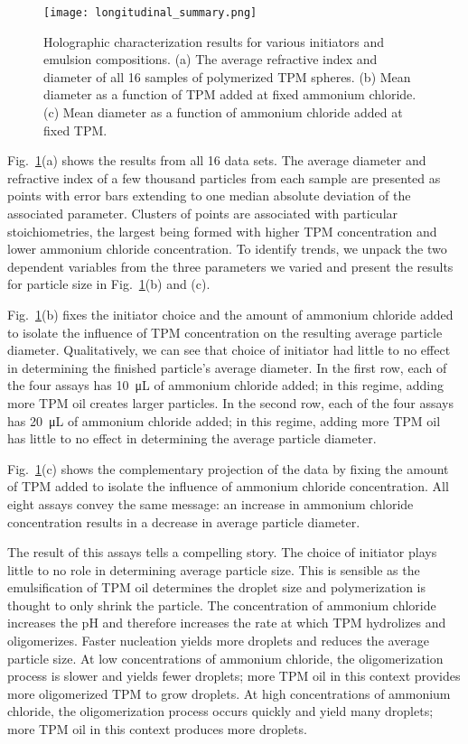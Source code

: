 \begin{figure}
    \centering
    \texttt{[image: longitudinal\_summary.png]}
    \caption{Holographic characterization results for various initiators and
      emulsion compositions. (a) The average refractive index and diameter of
      all \num{16} samples of polymerized TPM spheres.
     (b) Mean diameter as a function of TPM added at fixed ammonium chloride.
     (c) Mean diameter as a function of ammonium chloride added at fixed TPM.}
    \label{fig:longitudinal_summary}
\end{figure}

Fig.~\ref{fig:longitudinal_summary}(a) shows the results from all \num{16} data sets.
The average diameter and refractive index of a few thousand particles from each sample
are presented as points with error bars extending to one median absolute deviation
of the associated parameter. Clusters of points are associated with particular
stoichiometries, the largest being formed with higher TPM concentration
and lower ammonium chloride concentration.
To identify trends, we unpack the two dependent variables from the three
parameters we varied and present the  results for particle size in
Fig.~\ref{fig:longitudinal_summary}(b) and (c).

Fig.~\ref{fig:longitudinal_summary}(b) fixes the initiator choice and the
amount of ammonium chloride added to isolate the influence of TPM concentration
on the resulting average particle diameter. Qualitatively, we can see that
choice of initiator had little to no effect in determining the finished particle's
average diameter. In the first row, each of the four assays has \SI{10}{\micro\liter}
of ammonium chloride added; in this regime, adding more TPM oil
creates larger particles. In the second row, each of the four
assays has \SI{20}{\micro\liter} of ammonium chloride added; in this regime, adding
more TPM oil has little to no effect in determining the average particle diameter.

Fig.~\ref{fig:longitudinal_summary}(c) shows the complementary projection
of the data by fixing the amount of TPM added to isolate the influence of
ammonium chloride concentration. All eight assays convey the same message:
an increase in ammonium chloride concentration results in a decrease in
average particle diameter.

The result of this assays tells a compelling story. The choice of initiator plays little
to no role in determining average particle size. This is sensible as the emulsification
of TPM oil determines the droplet size and polymerization is thought to only
shrink the particle. The concentration of ammonium chloride increases the pH and
therefore increases the rate at which TPM hydrolizes and oligomerizes. Faster nucleation
yields more droplets and reduces the average particle size.
At low concentrations of ammonium chloride, the oligomerization process is slower
and yields fewer droplets; more TPM oil in this context provides more oligomerized
TPM to grow droplets. At high concentrations of ammonium chloride, the oligomerization
process occurs quickly and yield many droplets; more TPM oil in this context produces
more droplets.


